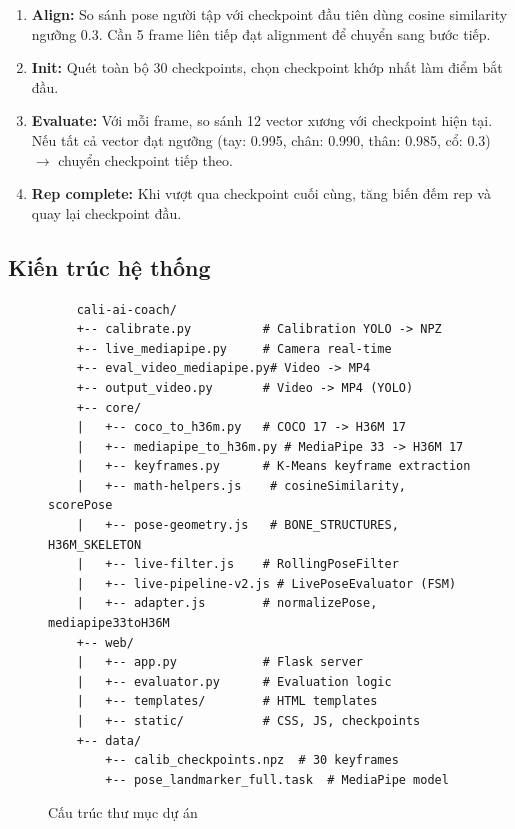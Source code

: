 \documentclass[a4paper,12pt]{article}
\begin{document}
\begin{enumerate}[leftmargin=*]
    \item \textbf{Align:} So sánh pose người tập với checkpoint đầu tiên dùng cosine similarity ngưỡng 0.3. Cần 5 frame liên tiếp đạt alignment để chuyển sang bước tiếp.
    \item \textbf{Init:} Quét toàn bộ 30 checkpoints, chọn checkpoint khớp nhất làm điểm bắt đầu.
    \item \textbf{Evaluate:} Với mỗi frame, so sánh 12 vector xương với checkpoint hiện tại. Nếu tất cả vector đạt ngưỡng (tay: 0.995, chân: 0.990, thân: 0.985, cổ: 0.3) $\rightarrow$ chuyển checkpoint tiếp theo.
    \item \textbf{Rep complete:} Khi vượt qua checkpoint cuối cùng, tăng biến đếm rep và quay lại checkpoint đầu.
\end{enumerate}

\subsection{Kiến trúc hệ thống}

\begin{figure}[H]
    \centering
    \begin{minipage}{0.85\textwidth}
    \begin{verbatim}
    cali-ai-coach/
    +-- calibrate.py          # Calibration YOLO -> NPZ
    +-- live_mediapipe.py     # Camera real-time
    +-- eval_video_mediapipe.py# Video -> MP4
    +-- output_video.py       # Video -> MP4 (YOLO)
    +-- core/
    |   +-- coco_to_h36m.py   # COCO 17 -> H36M 17
    |   +-- mediapipe_to_h36m.py # MediaPipe 33 -> H36M 17
    |   +-- keyframes.py      # K-Means keyframe extraction
    |   +-- math-helpers.js    # cosineSimilarity, scorePose
    |   +-- pose-geometry.js   # BONE_STRUCTURES, H36M_SKELETON
    |   +-- live-filter.js    # RollingPoseFilter
    |   +-- live-pipeline-v2.js # LivePoseEvaluator (FSM)
    |   +-- adapter.js        # normalizePose, mediapipe33toH36M
    +-- web/
    |   +-- app.py            # Flask server
    |   +-- evaluator.py      # Evaluation logic
    |   +-- templates/        # HTML templates
    |   +-- static/           # CSS, JS, checkpoints
    +-- data/
        +-- calib_checkpoints.npz  # 30 keyframes
        +-- pose_landmarker_full.task  # MediaPipe model
    \end{verbatim}
    \end{minipage}
    \caption{Cấu trúc thư mục dự án}
    \label{fig:structure}
\end{figure}
\end{document}
